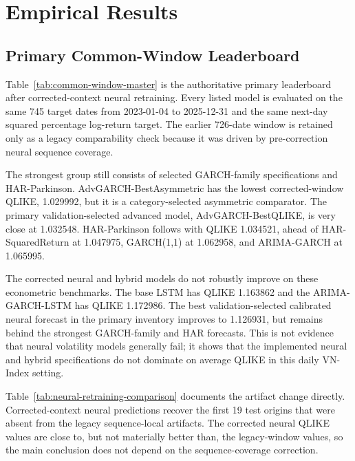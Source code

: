 \section{Empirical Results}

\subsection{Primary Common-Window Leaderboard}



Table~\ref{tab:common-window-master} is the authoritative primary leaderboard after corrected-context neural retraining. Every listed model is evaluated on the same 745 target dates from 2023-01-04 to 2025-12-31 and the same next-day squared percentage log-return target. The earlier 726-date window is retained only as a legacy comparability check because it was driven by pre-correction neural sequence coverage.

The strongest group still consists of selected GARCH-family specifications and HAR-Parkinson. AdvGARCH-BestAsymmetric has the lowest corrected-window QLIKE, 1.029992, but it is a category-selected asymmetric comparator. The primary validation-selected advanced model, AdvGARCH-BestQLIKE, is very close at 1.032548. HAR-Parkinson follows with QLIKE 1.034521, ahead of HAR-SquaredReturn at 1.047975, GARCH(1,1) at 1.062958, and ARIMA-GARCH at 1.065995.

The corrected neural and hybrid models do not robustly improve on these econometric benchmarks. The base LSTM has QLIKE 1.163862 and the ARIMA-GARCH-LSTM has QLIKE 1.172986. The best validation-selected calibrated neural forecast in the primary inventory improves to 1.126931, but remains behind the strongest GARCH-family and HAR forecasts. This is not evidence that neural volatility models generally fail; it shows that the implemented neural and hybrid specifications do not dominate on average QLIKE in this daily VN-Index setting.



Table~\ref{tab:neural-retraining-comparison} documents the artifact change directly. Corrected-context neural predictions recover the first 19 test origins that were absent from the legacy sequence-local artifacts. The corrected neural QLIKE values are close to, but not materially better than, the legacy-window values, so the main conclusion does not depend on the sequence-coverage correction.

